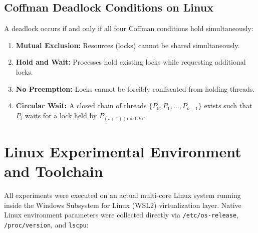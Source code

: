 \documentclass[11pt,a4paper]{article}
\begin{document}
\subsection{Coffman Deadlock Conditions on Linux}
A deadlock occurs if and only if all four Coffman conditions hold simultaneously:
\begin{enumerate}
    \item \textbf{Mutual Exclusion:} Resources (locks) cannot be shared simultaneously.
    \item \textbf{Hold and Wait:} Processes hold existing locks while requesting additional locks.
    \item \textbf{No Preemption:} Locks cannot be forcibly confiscated from holding threads.
    \item \textbf{Circular Wait:} A closed chain of threads $\{P_0, P_1, \dots, P_{k-1}\}$ exists such that $P_i$ waits for a lock held by $P_{(i+1) \pmod k}$.
\end{enumerate}

\section{Linux Experimental Environment and Toolchain}

All experiments were executed on an actual multi-core Linux system running inside the Windows Subsystem for Linux (WSL2) virtualization layer. Native Linux environment parameters were collected directly via \texttt{/etc/os-release}, \texttt{/proc/version}, and \texttt{lscpu}:
\end{document}

